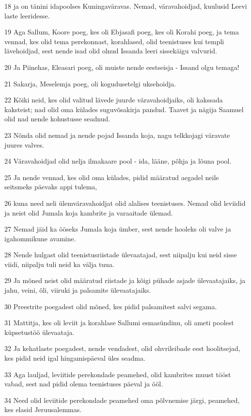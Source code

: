\par 18 ja on tänini idapoolses Kuningaväravas. Nemad, väravahoidjad, kuulusid Leevi laste leeridesse.
\par 19 Aga Sallum, Koore poeg, kes oli Ebjasafi poeg, kes oli Korahi poeg, ja tema vennad, kes olid tema perekonnast, korahlased, olid teenistuses kui templi lävehoidjad, sest nende isad olid olnud Issanda leeri sissekäigu valvurid.
\par 20 Ja Piinehas, Eleasari poeg, oli muiste nende eestseisja - Issand olgu temaga!
\par 21 Sakarja, Meselemja poeg, oli kogudusetelgi uksehoidja.
\par 22 Kõiki neid, kes olid valitud lävede juurde väravahoidjaiks, oli kakssada kaksteist; nad olid oma külades suguvõsakirja pandud. Taavet ja nägija Saamuel olid nad nende kohustusse seadnud.
\par 23 Nõnda olid nemad ja nende pojad Issanda koja, nagu telkkojagi väravate juures valves.
\par 24 Väravahoidjad olid nelja ilmakaare pool - ida, lääne, põhja ja lõuna pool.
\par 25 Ja nende vennad, kes olid oma külades, pidid määratud aegadel neile seitsmeks päevaks appi tulema,
\par 26 kuna need neli ülemväravahoidjat olid alalises teenistuses. Nemad olid leviidid ja neist olid Jumala koja kambrite ja varaaitade ülemad.
\par 27 Nemad jäid ka ööseks Jumala koja ümber, sest nende hooleks oli valve ja igahommikune avamine.
\par 28 Nende hulgast olid teenistusriistade ülevaatajad, sest niipalju kui neid sisse viidi, niipalju tuli neid ka välja tuua.
\par 29 Ja mõned neist olid määratud riistade ja kõigi pühade asjade ülevaatajaiks, ja jahu, veini, õli, viiruki ja palsamite ülevaatajaiks.
\par 30 Preestrite poegadest olid mõned, kes pidid palsamitest salvi segama.
\par 31 Mattitja, kes oli leviit ja korahlase Sallumi esmasündinu, oli ameti poolest küpsetustöö ülevaataja.
\par 32 Ja kehatlaste poegadest, nende vendadest, olid ohvrileibade eest hoolitsejad, kes pidid neid igal hingamispäeval üles seadma.
\par 33 Aga lauljad, leviitide perekondade peamehed, olid kambrites muust tööst vabad, sest nad pidid olema teenistuses päeval ja ööl.
\par 34 Need olid leviitide perekondade peamehed oma põlvnemise järgi, peamehed, kes elasid Jeruusalemmas.
